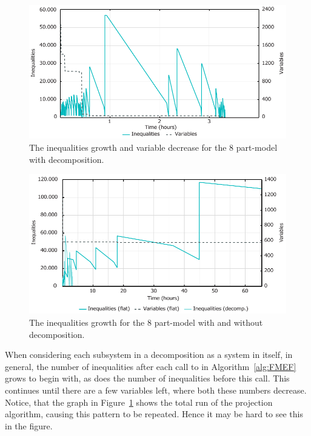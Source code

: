 \begin{figure}[htbp]
	\centering
		\includegraphics[scale=0.7]{figures/decompIneqGrowth2.pdf}
	\caption{The inequalities growth and variable decrease for the 8 part-model with decomposition.}
	\label{fig:8parts}
\end{figure}

\begin{figure}[htbp]
	\centering
		\includegraphics[scale =0.7]{figures/ineqGrowth2.pdf}
	\caption{The inequalities growth for the 8 part-model with and without decomposition.}
	\label{fig:compare}
\end{figure}

When considering each subsystem in a decomposition as a system in itself, in general, the number of inequalities after each call to  in Algorithm~\ref{alg:FMEF} grows to begin with, as does the number of inequalities before this call. This continues until there are a few variables left, where both these numbers decrease. Notice, that the graph in Figure~\ref{fig:8parts} shows the total run of the projection algorithm, causing this pattern to be repeated. Hence it may be hard to see this in the figure.

